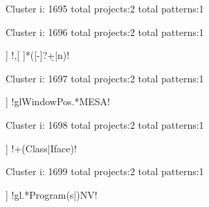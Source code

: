 Cluster i: 1695
total projects:2
total patterns:1
\begin{multicols}{1}
\end{multicols}







Cluster i: 1696
total projects:2
total patterns:1
\begin{multicols}{1}
\begin{description}[noitemsep,topsep=0pt]
\item [[2] ] \cverb!,[ ]*([-]?\d+|n)!
\end{description}
\end{multicols}







Cluster i: 1697
total projects:2
total patterns:1
\begin{multicols}{1}
\begin{description}[noitemsep,topsep=0pt]
\item [[2] ] \cverb!glWindowPos.*MESA!
\end{description}
\end{multicols}







Cluster i: 1698
total projects:2
total patterns:1
\begin{multicols}{1}
\begin{description}[noitemsep,topsep=0pt]
\item [[2] ] \cverb!\w+(Class|Iface)!
\end{description}
\end{multicols}







Cluster i: 1699
total projects:2
total patterns:1
\begin{multicols}{1}
\begin{description}[noitemsep,topsep=0pt]
\item [[2] ] \cverb!gl.*Program(s|)NV!
\end{description}
\end{multicols}







